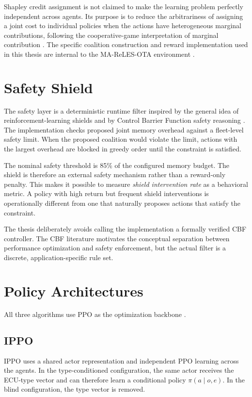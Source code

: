 \documentclass{iutbscthesis}
\begin{document}
Shapley credit assignment is not claimed to make the learning problem perfectly independent across agents. Its purpose is to reduce the arbitrariness of assigning a joint cost to individual policies when the actions have heterogeneous marginal contributions, following the cooperative-game interpretation of marginal contribution \parencite{shapley1953value,castro2009shapley}. The specific coalition construction and reward implementation used in this thesis are internal to the MA-ReLES-OTA environment \parencite{ma_reles_ota_repo}.

\section{Safety Shield}
The safety layer is a deterministic runtime filter inspired by the general idea of reinforcement-learning shields \parencite{alshiekh2018shielding} and by Control Barrier Function safety reasoning \parencite{ames2019cbf}. The implementation checks proposed joint memory overhead against a fleet-level safety limit. When the proposed coalition would violate the limit, actions with the largest overhead are blocked in greedy order until the constraint is satisfied.

The nominal safety threshold is 85\% of the configured memory budget. The shield is therefore an external safety mechanism rather than a reward-only penalty. This makes it possible to measure \emph{shield intervention rate} as a behavioral metric. A policy with high return but frequent shield interventions is operationally different from one that naturally proposes actions that satisfy the constraint.

The thesis deliberately avoids calling the implementation a formally verified CBF controller. The CBF literature motivates the conceptual separation between performance optimization and safety enforcement, but the actual filter is a discrete, application-specific rule set.

\section{Policy Architectures}\label{sec:architectures}
All three algorithms use PPO as the optimization backbone \parencite{schulman2017ppo}.

\subsection{IPPO}
IPPO uses a shared actor representation and independent PPO learning across the agents. In the type-conditioned configuration, the same actor receives the ECU-type vector and can therefore learn a conditional policy $\pi(a\mid o, e)$. In the blind configuration, the type vector is removed.
\end{document}

